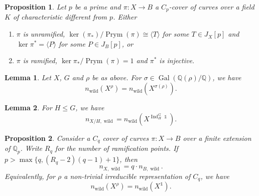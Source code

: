 \documentclass[10pt,a4paper]{amsart}
\newtheorem{lemma}{Lemma}
\newtheorem{proposition}{Proposition}
\DeclareMathOperator{\Gal}{Gal}
\DeclareMathOperator{\Ind}{Ind}
\DeclareMathOperator{\Prym}{Prym}
\newcommand{\QQ}{\mathbb{Q}}
\DeclareMathOperator{\one}{\mathds{1}}
\DeclareMathOperator{\wild}{wild}
\begin{document}
\begin{proposition}\label{prop:push-pull}
    Let $p$ be a prime and $\pi: X\to B$ a $C_p$-cover of curves over a field $K$ of characteristic different from $p$. Either
    \begin{enumerate}
        \item $\pi$ is unramified, $\ker(\pi_*)/\Prym(\pi)\cong \langle T\rangle$ for some $T\in J_X[p]$ and $\ker\pi^*=\langle P\rangle$ for some $P\in J_B[p]$, or
        \item $\pi$ is ramified, $\ker\pi_*/\Prym(\pi)=1$ and $\pi^*$ is injective.
    \end{enumerate}
\end{proposition}

\begin{lemma}\label{lem:conj_cond}
    Let $X$, $G$ and $\rho$ be as above. For $\sigma \in \Gal(\QQ(\rho)/\QQ)$, we have
    \[ n_{\wild}(X^\rho) = n_{\wild}(X^{\sigma(\rho)}). \]
\end{lemma}

\begin{lemma}\label{lem:curvinduct}
    For $H\le G$, we have
    \[n_{X/H,\wild}=n_{\wild}(X^{\Ind_H^G \one}).\]
\end{lemma}

\begin{proposition}\label{prop:Cq_main}
    Consider a $C_q$ cover of curves $\pi: X\to B$ over a finite extension of $\QQ_p$. Write $R_q$ for the number of ramification points. If $p>\max\{q,(R_q-2)(q-1)+1\}$, then
    \[n_{X,\wild}=q\cdot n_{B,\wild}.\]
    Equivalently, for $\rho$ a non-trivial irreducible representation of $C_q$, we have
    \[ n_{\wild}(X^\rho)=n_{\wild}(X^{\one}). \]
\end{proposition}
\end{document}
